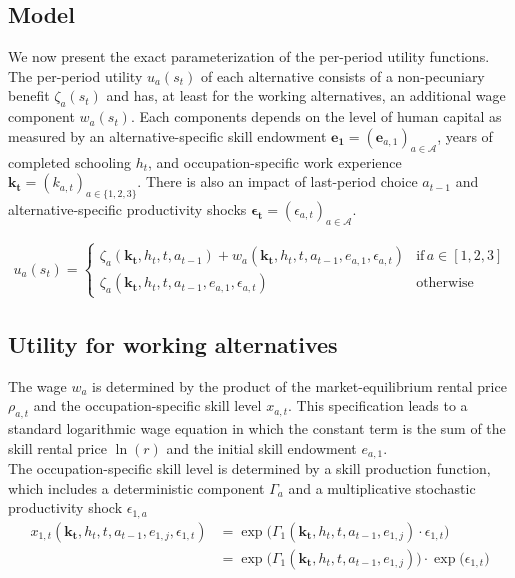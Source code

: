 \subsection{Model}\label{Appendix model}
We now present the exact parameterization of the per-period utility functions. The per-period utility $u_a(s_t)$ of each alternative consists of a non-pecuniary benefit $\zeta_a(s_t)$ and has, at least for the working alternatives, an additional wage component $w_a(s_t)$. Each components depends on the level of human capital as measured by an alternative-specific skill endowment $\bm{e_1} = \left(\bm{e}_{a,1}\right)_{a\in\mathcal{A}}$, years of completed schooling $h_t$, and occupation-specific work experience $\bm{k_t} = \left(k_{a,t}\right)_{a\in\{1, 2, 3\}}$. There is also an impact of last-period choice $a_{t -1}$ and alternative-specific productivity shocks
$\bm{\epsilon_t} = \left(\epsilon_{a,t}\right)_{a\in\mathcal{A}}$.

\begin{align*}
u_a(s_t) =
\begin{cases}
    \zeta_a(\bm{k_t}, h_t, t, a_{t -1})  + w_a(\bm{k_t}, h_t, t, a_{t -1}, e_{a,1}, \epsilon_{a,t})              & \text{if}\, a \in [1, 2, 3]  \\
    \zeta_a(\bm{k_t}, h_t, t, a_{t-1}, e_{a,1}, \epsilon_{a,t})                                    & \text{otherwise}
\end{cases}
\end{align*}
\subsection{Utility for working alternatives}
The wage $w_{a}$ is determined by the product of the market-equilibrium rental price $\rho_{a,t}$ and the occupation-specific skill level $x_{a,t}$. This specification leads to a standard logarithmic wage equation in which the constant term is the sum of the skill rental price $\ln(r)$ and the initial skill endowment $e_{a,1}$.\\

The occupation-specific skill level is determined by a skill production function, which includes a deterministic component $\Gamma_a$ and a multiplicative stochastic productivity shock $\epsilon_{1,a}$
%
\begin{align}\label{eq:WhiteCollarSkillLevel}
    x_{1,t}(\bm{k_t}, h_t, t, a_{t-1}, e_{1,j}, \epsilon_{1,t}) & = \exp \big( \Gamma_{1}(\bm{k_t},  h_t, t, a_{t-1}, e_{1,j}) \cdot \epsilon_{1,t} \big) \\\nonumber
                & = \exp \big( \Gamma_1(\bm{k_t},  h_t, t, a_{t-1}, e_{1,j}) \big) \cdot \exp \big( \epsilon_{1,t} \big)
\end{align}
